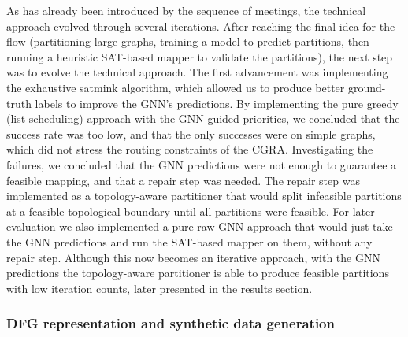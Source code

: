 As has already been introduced by the sequence of meetings, the technical approach evolved through several iterations. After reaching the final idea for the flow (partitioning large graphs, training a model to predict partitions, then running a heuristic SAT-based mapper to validate the partitions), the next step was to evolve the technical approach. The first advancement was implementing the exhaustive \gls{satmink} algorithm, which allowed us to produce better ground-truth labels to improve the GNN's predictions. By implementing the pure greedy (list-scheduling) approach with the GNN-guided priorities, we concluded that the success rate was too low, and that the only successes were on simple graphs, which did not stress the routing constraints of the CGRA\@. Investigating the failures, we concluded that the GNN predictions were not enough to guarantee a feasible mapping, and that a repair step was needed. The repair step was implemented as a topology-aware partitioner that would split infeasible partitions at a feasible topological boundary until all partitions were feasible. For later evaluation we also implemented a pure raw GNN approach that would just take the GNN predictions and run the SAT-based mapper on them, without any repair step. Although this now becomes an iterative approach, with the GNN predictions the topology-aware partitioner is able to produce feasible partitions with low iteration counts, later presented in the results section.

%

\subsubsection{DFG representation and synthetic data generation}

